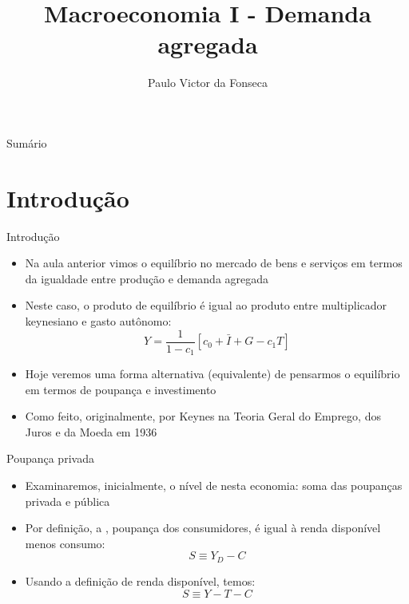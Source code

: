 \documentclass[10pt]{beamer}
\title[]{Macroeconomia I - Demanda agregada}
\author[]{Paulo Victor da Fonseca}
\date{}
\begin{document}
\begin{frame}[plain]
\end{frame}

\begin{frame}{Sumário}
    \tableofcontents
\end{frame}

\section{Introdução}
\begin{frame}
    {Introdução}
    \begin{itemize}
        \item Na aula anterior vimos o equilíbrio no mercado de bens e serviços em termos da igualdade entre produção e demanda agregada\bigskip
        \item Neste caso, o produto de equilíbrio é igual ao produto entre multiplicador keynesiano e gasto autônomo:
              \[
                  Y = \frac{1}{1-c_1}[c_0 + \bar{I} + G - c_1T]
              \]
        \item Hoje veremos uma forma alternativa (equivalente) de pensarmos o equilíbrio em termos de poupança e investimento\bigskip
        \item Como feito, originalmente, por Keynes na Teoria Geral do Emprego, dos Juros e da Moeda em 1936
    \end{itemize}
\end{frame}

\begin{frame}
    {Poupança privada}
    \begin{itemize}
        \item Examinaremos, inicialmente, o nível de  nesta economia: soma das poupanças privada e pública\bigskip
        \item Por definição, a , poupança dos consumidores, é igual à renda disponível menos consumo:
              \begin{equation}
                  S \equiv Y_D - C
              \end{equation}
        \item Usando a definição de renda disponível, temos:
              \[
                  S \equiv Y - T - C
              \]
    \end{itemize}
\end{frame}
\end{document}
